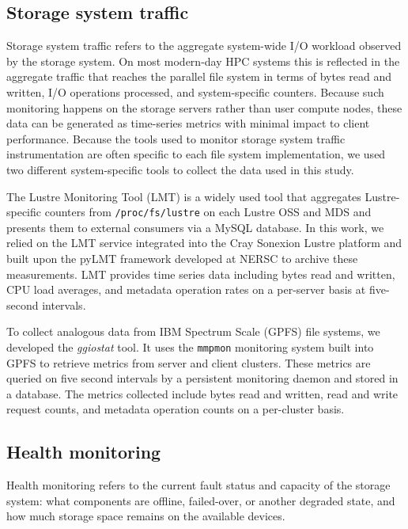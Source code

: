\subsection{Storage system traffic}

Storage system traffic refers to the aggregate system-wide I/O workload observed by the storage system.
On most modern-day HPC systems this is reflected in the aggregate traffic that reaches the parallel file system in terms of bytes read and written, I/O operations processed, and system-specific counters.
Because such monitoring happens on the storage servers rather than user compute nodes, these data can be generated as time-series metrics with minimal impact to client performance.
Because the tools used to monitor storage system traffic instrumentation are often specific to each file system implementation, we used two different system-specific tools to collect the data used in this study.

\label{sec:methods/lmt}
The Lustre Monitoring Tool (LMT) is a widely used tool that aggregates Lustre-specific counters from \texttt{/proc/fs/lustre} on each Lustre OSS and MDS and presents them to external consumers via a MySQL database.
In this work, we relied on the LMT service integrated into the Cray Sonexion Lustre platform \cite{Keopp2014} and built upon the pyLMT framework developed at NERSC \cite{Uselton2009} to archive these measurements.
LMT provides time series data including bytes read and written, CPU load averages, and metadata operation rates on a per-server basis at five-second intervals.

\label{sec:methods/ggiostat}
To collect analogous data from IBM Spectrum Scale (GPFS) file systems, we developed the \emph{ggiostat} tool.
It uses the \texttt{mmpmon} monitoring system built into GPFS to retrieve metrics from server and client clusters.
These metrics are queried on five second intervals by a persistent monitoring daemon and stored in a database.
The metrics collected include bytes read and written, read and write request counts, and metadata operation counts on a per-cluster basis.

\subsection{Health monitoring }
\label{sec:methods/health}

Health monitoring refers to the current fault status and capacity of the
storage system: what components are offline, failed-over, or another degraded state, and how much storage space remains on the available devices.

